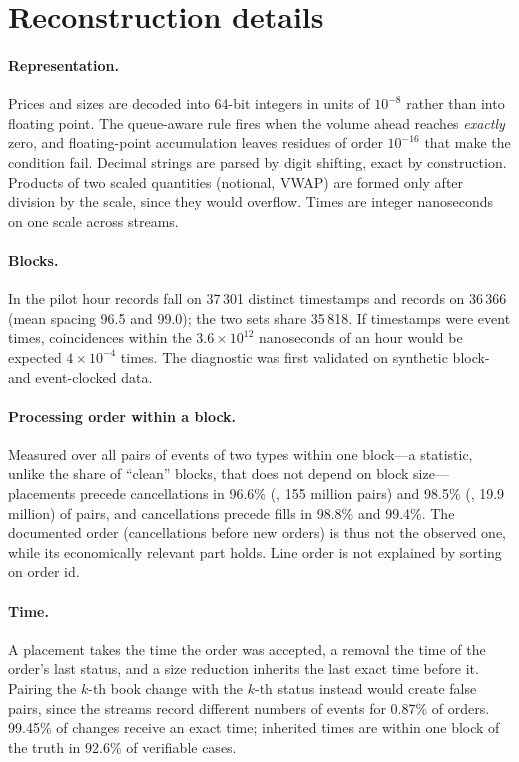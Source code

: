 \section{Reconstruction details}
\label{app:reconstruction}

\paragraph{Representation.}
Prices and sizes are decoded into 64-bit integers in units of $10^{-8}$ rather
than into floating point. The queue-aware rule fires when the volume ahead
reaches \emph{exactly} zero, and floating-point accumulation leaves residues of
order $10^{-16}$ that make the condition fail. Decimal strings are parsed by digit
shifting, exact by construction. Products of two scaled quantities (notional,
VWAP) are formed only after division by the scale, since they would overflow.
Times are integer nanoseconds on one scale across streams.

\paragraph{Blocks.}
In the pilot hour \BTC{} records fall on 37\,301 distinct timestamps and \SOL{}
records on 36\,366 (mean spacing 96.5 and 99.0\ms); the two sets share 35\,818.
If timestamps were event times, coincidences within the $3.6\times10^{12}$
nanoseconds of an hour would be expected $4\times10^{-4}$ times. The diagnostic
was first validated on synthetic block- and event-clocked data.

\paragraph{Processing order within a block.}
Measured over all pairs of events of two types within one block---a statistic,
unlike the share of ``clean'' blocks, that does not depend on block
size---placements precede cancellations in 96.6\% (\BTC, 155 million pairs) and
98.5\% (\SOL, 19.9 million) of pairs, and cancellations precede fills in 98.8\%
and 99.4\%. The documented order (cancellations before new orders) is thus not
the observed one, while its economically relevant part holds. Line order is not
explained by sorting on order id.

\paragraph{Time.}
A placement takes the time the order was accepted, a removal the time of the
order's last status, and a size reduction inherits the last exact time before it.
Pairing the $k$-th book change with the $k$-th status instead would create false
pairs, since the streams record different numbers of events for 0.87\% of orders.
99.45\% of \SOL{} changes receive an exact time; inherited times are within one
block of the truth in 92.6\% of verifiable cases.


